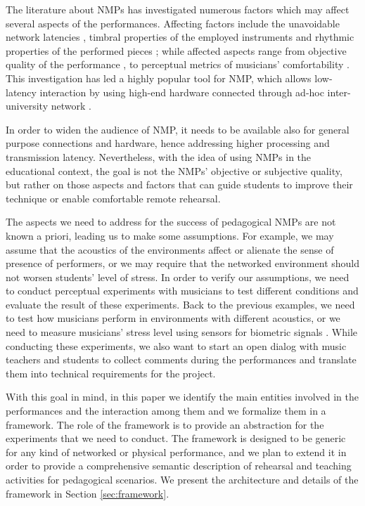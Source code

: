 The literature about NMPs has investigated numerous factors which may affect several aspects of the performances. Affecting factors include the unavoidable network latencies \cite{Chafe1}, timbral properties of the employed instruments \cite{Kolazi2013} and rhythmic properties of the performed pieces \cite{RottondiFeature}; while affected aspects range from objective quality of the performance \cite{Chafe3}, to perceptual metrics of musicians' comfortability \cite{CIM2018}. This investigation has led a highly popular tool for NMP, which allows low-latency interaction by using high-end hardware connected through ad-hoc inter-university network \cite{drioli2013networked}. 

In order to widen the audience of NMP, it needs to be available also for general purpose connections and hardware, hence addressing higher processing and transmission latency. Nevertheless, with the idea of using NMPs in the educational context, the goal is not the NMPs' objective or subjective quality, but rather on those aspects and factors that can guide students to improve their technique or enable comfortable remote rehearsal. 

The aspects we need to address for the success of pedagogical NMPs are not known a priori, leading us to make some assumptions. For example, we may assume that the acoustics of the environments affect or alienate the sense of presence of performers, or we may require that the networked environment should not worsen students' level of stress. In order to verify our assumptions, we need to conduct perceptual experiments with musicians to test different conditions and evaluate the result of these experiments. Back to the previous examples, we need to test how musicians perform in environments with different acoustics, or we need to measure musicians' stress level using sensors for biometric signals \cite{Yoshie2009}. While conducting these experiments, we also want to start an open dialog with music teachers and students to collect comments during the performances and translate them into technical requirements for the project. 

With this goal in mind, in this paper we identify the main entities involved in the performances and the interaction among them and we formalize them in a framework. The role of the framework is to provide an abstraction for the experiments that we need to conduct. The framework is designed to be generic for any kind of networked or physical performance, and we plan to extend it in order to provide a comprehensive semantic description of rehearsal and teaching activities for pedagogical scenarios. We present the architecture and details of the framework in Section \ref{sec:framework}.

